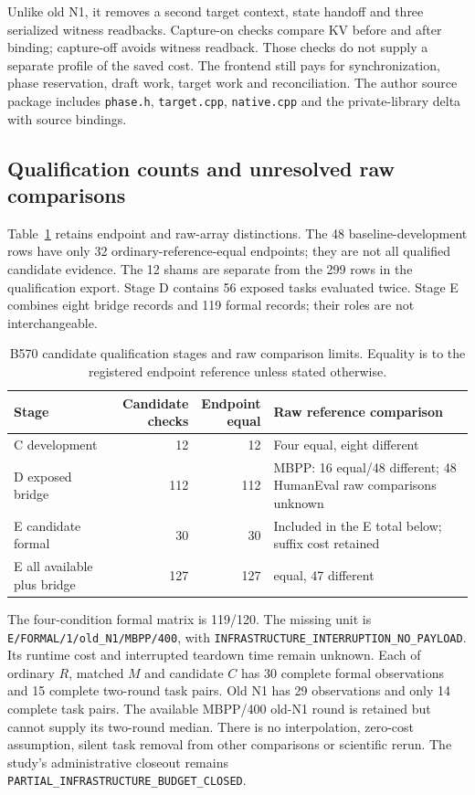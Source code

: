 Unlike old N1, it removes a second target context, state handoff and three serialized witness readbacks. Capture-on checks compare KV before and after binding; capture-off avoids witness readback. Those checks do not supply a separate profile of the saved cost. The frontend still pays for synchronization, phase reservation, draft work, target work and reconciliation. The author source package includes \texttt{phase.h}, \texttt{target.cpp}, \texttt{native.cpp} and the private-library delta with source bindings.

\subsection{Qualification counts and unresolved raw comparisons}
\label{supp:b570_missingness}
Table~\ref{tab:b570_qualification} retains endpoint and raw-array distinctions. The 48 baseline-development rows have only 32 ordinary-reference-equal endpoints; they are not all qualified candidate evidence. The 12 shams are separate from the 299 rows in the qualification export. Stage D contains 56 exposed tasks evaluated twice. Stage E combines eight bridge records and 119 formal records; their roles are not interchangeable.

\begin{table}[ht]\centering\small
\caption{B570 candidate qualification stages and raw comparison limits. Equality is to the registered endpoint reference unless stated otherwise.}
\label{tab:b570_qualification}
\begin{tabularx}{\linewidth}{@{}>{\raggedright\arraybackslash}p{.25\linewidth}rr>{\raggedright\arraybackslash}X@{}}\toprule
Stage & \shortstack{Candidate\\checks} & \shortstack{Endpoint\\equal} & Raw reference comparison\\\midrule
C development & 12 & 12 & Four equal, eight different\\
D exposed bridge & 112 & 112 & MBPP: 16 equal/48 different; 48 HumanEval raw comparisons unknown\\
E candidate formal & 30 & 30 & Included in the E total below; suffix cost retained\\
E all available plus bridge & 127 & 127 & 80 equal, 47 different\\\bottomrule
\end{tabularx}
\end{table}

The four-condition formal matrix is 119/120. The missing unit is \nolinkurl{E/FORMAL/1/old_N1/MBPP/400}, with \nolinkurl{INFRASTRUCTURE_INTERRUPTION_NO_PAYLOAD}. Its runtime cost and interrupted teardown time remain unknown. Each of ordinary $R$, matched $M$ and candidate $C$ has 30 complete formal observations and 15 complete two-round task pairs. Old N1 has 29 observations and only 14 complete task pairs. The available MBPP/400 old-N1 round is retained but cannot supply its two-round median. There is no interpolation, zero-cost assumption, silent task removal from other comparisons or scientific rerun. The study's administrative closeout remains \nolinkurl{PARTIAL_INFRASTRUCTURE_BUDGET_CLOSED}.

